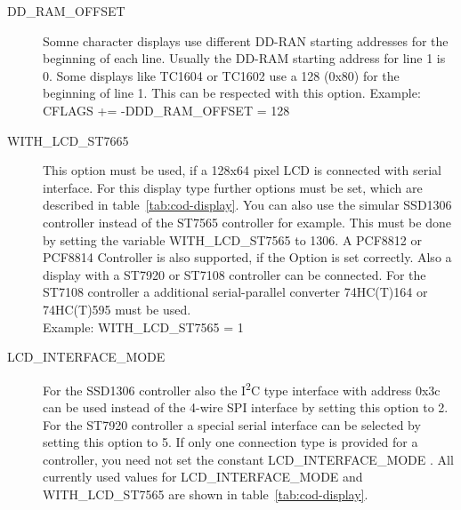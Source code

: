 \begin{description}
  \item[DD\_RAM\_OFFSET] Somne character displays use different DD-RAN starting addresses for the beginning of each line.
Usually the DD-RAM starting address for line 1 is 0.
Some displays like TC1604 or TC1602 use a 128 (0x80) for the beginning of line 1.
This can be respected with this option.
Example: CFLAGS += -DDD\_RAM\_OFFSET = 128

  \item[WITH\_LCD\_ST7665] This option must be used, if a 128x64 pixel LCD is connected with serial
interface. For this display type further options must be set, which are described in table~\ref{tab:cod-display}.
You can also use the simular SSD1306 controller instead of the ST7565 controller for example.
This must be done by setting the variable WITH\_LCD\_ST7565 to 1306.
A PCF8812 or PCF8814 Controller is also supported, if the Option is set correctly.
Also a display with a ST7920 or ST7108 controller can be connected.
For the ST7108 controller a additional serial-parallel converter 74HC(T)164 or 74HC(T)595 must be used.  \\
Example: WITH\_LCD\_ST7565 = 1 

 \item[LCD\_INTERFACE\_MODE] For the SSD1306 controller also the I\textsuperscript{2}C type interface with address 0x3c
can be used  instead of the 4-wire SPI interface by setting this option to 2.
For the ST7920 controller a special serial interface can be selected by setting this option to 5.
If only one connection type is provided for a controller, you need not set the constant LCD\_INTERFACE\_MODE .
All currently used values for LCD\_INTERFACE\_MODE and WITH\_LCD\_ST7565 are shown in table~\ref{tab:cod-display}. \\


\end{description}
